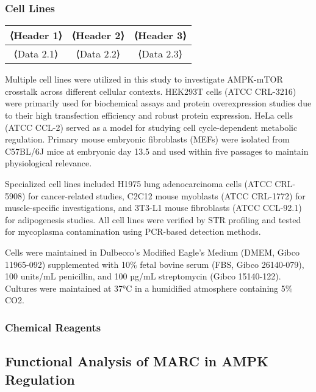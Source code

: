 \documentclass[11
pt,a4paper]{article}
\begin{document}
\subsubsection{Cell Lines}

\begin{tabular}{|c|c|c|}
    \hline
    \textbf{⟨Header 1⟩} & \textbf{⟨Header 2⟩} & \textbf{⟨Header 3⟩} \\
    \hline
    ⟨Data 2.1⟩ & ⟨Data 2.2⟩ & ⟨Data 2.3⟩ \\
    \hline
\end{tabular}

Multiple cell lines were utilized in this study to investigate AMPK-mTOR crosstalk across different cellular contexts. HEK293T cells (ATCC CRL-3216) were primarily used for biochemical assays and protein overexpression studies due to their high transfection efficiency and robust protein expression. HeLa cells (ATCC CCL-2) served as a model for studying cell cycle-dependent metabolic regulation. Primary mouse embryonic fibroblasts (MEFs) were isolated from C57BL/6J mice at embryonic day 13.5 and used within five passages to maintain physiological relevance.

Specialized cell lines included H1975 lung adenocarcinoma cells (ATCC CRL-5908) for cancer-related studies, C2C12 mouse myoblasts (ATCC CRL-1772) for muscle-specific investigations, and 3T3-L1 mouse fibroblasts (ATCC CCL-92.1) for adipogenesis studies. All cell lines were verified by STR profiling and tested for mycoplasma contamination using PCR-based detection methods.

Cells were maintained in Dulbecco's Modified Eagle's Medium (DMEM, Gibco 11965-092) supplemented with 10\% fetal bovine serum (FBS, Gibco 26140-079), 100 units/mL penicillin, and %
100 µg/mL streptomycin (Gibco 15140-122). Cultures were maintained at %
37°C in a humidified atmosphere containing 5\% CO2.

\subsubsection{Chemical Reagents}

\subsection{Functional Analysis of MARC in AMPK Regulation}

\end{document}
